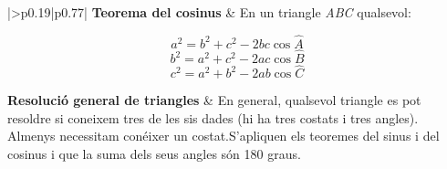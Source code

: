 \begin{center}
\begin{longtable}[h]{|>{\raggedleft\arraybackslash}p{0.19\linewidth}|p{0.77\linewidth}|}
\noindent \textbf{Teorema del cosinus}  &   
En un triangle\textit{ ABC} qualsevol: 

\[a^{2} =b^{2} +c^{2} -2bc\cos \hat A \]
\[b^{2} =a^{2} +c^{2} -2ac\cos \hat B \]
\[c^{2} =a^{2} +b^{2} -2ab\cos \hat C \]
\hline

\noindent \textbf{Resolució general de triangles}  &   
En general, qualsevol triangle es pot resoldre si coneixem tres de les sis dades (hi ha tres costats i tres angles). Almenys necessitam conéixer un costat.\newline S'apliquen els teoremes del sinus i del cosinus i que la suma dels seus angles són 180 graus.  
\hline \bottomrule
	\end{longtable}
\end{center}

\pagebreak
 

